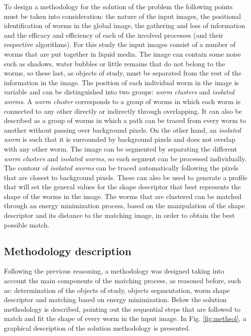 To design a methodology for the solution of the problem the following
points must be taken into consideration: the nature of the input
images, the positional identification of worms in the global image,
the gathering and loss of information and the efficacy and efficiency
of each of the involved processes (and their respective algorithms).
For this study the input images consist of a number of worms that
are put together in liquid media. The image can contain some noise such as
shadows, water bubbles or little remains that do not belong to the worms, so
these last, as objects of study, must be separated from the rest of 
the information in the image. The position of each individual
worm in the image is variable and can be distinguished into two 
groups: \emph{worm clusters} and \emph{isolated worms}. A 
\emph{worm cluster} corresponds to a group of worms in which 
each worm is connected to any other directly or indirectly
through overlapping. It can also be described as a group of worms in which a 
path can be traced from every worm to another without passing over 
background pixels. On the other hand, an \emph{isolated worm} is such
that it is surrounded by background pixels and does not overlap
with any other worm. The image can be segmented by separating the different 
\emph{worm clusters} and \emph{isolated worms}, so each segment
can be processed individually. The contour of \emph{isolated worms} can be
traced automatically following the pixels that are closest to background pixels.
These can also be used to generate a profile that will set the general values
for the shape descriptor that best represents the shape of the worms in the image.
The worms that are clustered can be matched through an energy minimization
process, based on the manipulation of the shape descriptor and its distance
to the matching image, in order to obtain the best possible match.

\subsection{Methodology description}
\label{met:description}

Following the previous reasoning, a methodology was designed taking into account
the main components of the matching process, as reasoned before, such as: 
determination of the objects 
of study, objects segmentation, worm shape descriptor and matching based on 
energy minimization.
Below the solution methodology is described, pointing out the sequential steps
that are followed to match and fit the shape of every worm in the input image.
In Fig. \ref{fig:methsol}, a graphical description of the solution methodology is
presented.\\

